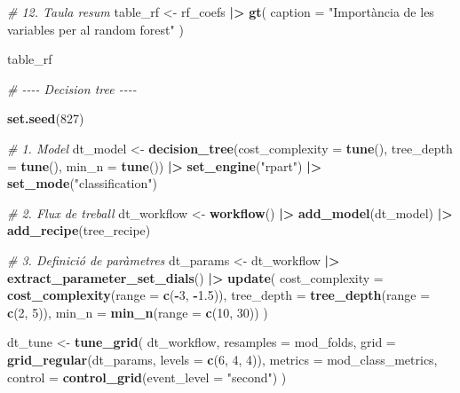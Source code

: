 \documentclass[CAT]{TFUOC}%
\newenvironment{Shaded}{\begin{snugshade}}{\end{snugshade}}
\newcommand{\AttributeTok}[1]{\textcolor[rgb]{0.13,0.29,0.53}{#1}}
\newcommand{\CommentTok}[1]{\textcolor[rgb]{0.56,0.35,0.01}{\textit{#1}}}
\newcommand{\DecValTok}[1]{\textcolor[rgb]{0.00,0.00,0.81}{#1}}
\newcommand{\FloatTok}[1]{\textcolor[rgb]{0.00,0.00,0.81}{#1}}
\newcommand{\FunctionTok}[1]{\textcolor[rgb]{0.13,0.29,0.53}{\textbf{#1}}}
\newcommand{\NormalTok}[1]{#1}
\newcommand{\OtherTok}[1]{\textcolor[rgb]{0.56,0.35,0.01}{#1}}
\newcommand{\SpecialCharTok}[1]{\textcolor[rgb]{0.81,0.36,0.00}{\textbf{#1}}}
\newcommand{\StringTok}[1]{\textcolor[rgb]{0.31,0.60,0.02}{#1}}
\begin{document}
\begin{Shaded}
\begin{Highlighting}[]
\CommentTok{\# 12. Taula resum}
\NormalTok{table\_rf }\OtherTok{\textless{}{-}}\NormalTok{ rf\_coefs }\SpecialCharTok{|\textgreater{}} 
  \FunctionTok{gt}\NormalTok{(}
    \AttributeTok{caption =} \StringTok{"Importància de les variables per al random forest"}
\NormalTok{  )}

\NormalTok{table\_rf}

\CommentTok{\# {-}{-}{-}{-} Decision tree {-}{-}{-}{-}}

\FunctionTok{set.seed}\NormalTok{(}\DecValTok{827}\NormalTok{)}

\CommentTok{\# 1. Model}
\NormalTok{dt\_model }\OtherTok{\textless{}{-}} \FunctionTok{decision\_tree}\NormalTok{(}\AttributeTok{cost\_complexity =} \FunctionTok{tune}\NormalTok{(), }
                          \AttributeTok{tree\_depth =} \FunctionTok{tune}\NormalTok{(), }
                          \AttributeTok{min\_n =} \FunctionTok{tune}\NormalTok{()) }\SpecialCharTok{|\textgreater{}} 
  \FunctionTok{set\_engine}\NormalTok{(}\StringTok{"rpart"}\NormalTok{) }\SpecialCharTok{|\textgreater{}} 
  \FunctionTok{set\_mode}\NormalTok{(}\StringTok{"classification"}\NormalTok{)}

\CommentTok{\# 2. Flux de treball}
\NormalTok{dt\_workflow }\OtherTok{\textless{}{-}} \FunctionTok{workflow}\NormalTok{() }\SpecialCharTok{|\textgreater{}} 
  \FunctionTok{add\_model}\NormalTok{(dt\_model) }\SpecialCharTok{|\textgreater{}} 
  \FunctionTok{add\_recipe}\NormalTok{(tree\_recipe)}

\CommentTok{\# 3. Definició de paràmetres}
\NormalTok{dt\_params }\OtherTok{\textless{}{-}}\NormalTok{ dt\_workflow }\SpecialCharTok{|\textgreater{}} 
  \FunctionTok{extract\_parameter\_set\_dials}\NormalTok{() }\SpecialCharTok{|\textgreater{}} 
  \FunctionTok{update}\NormalTok{(}
    \AttributeTok{cost\_complexity =} \FunctionTok{cost\_complexity}\NormalTok{(}\AttributeTok{range =} \FunctionTok{c}\NormalTok{(}\SpecialCharTok{{-}}\DecValTok{3}\NormalTok{, }\SpecialCharTok{{-}}\FloatTok{1.5}\NormalTok{)), }
    \AttributeTok{tree\_depth =} \FunctionTok{tree\_depth}\NormalTok{(}\AttributeTok{range =} \FunctionTok{c}\NormalTok{(}\DecValTok{2}\NormalTok{, }\DecValTok{5}\NormalTok{)), }
    \AttributeTok{min\_n =} \FunctionTok{min\_n}\NormalTok{(}\AttributeTok{range =} \FunctionTok{c}\NormalTok{(}\DecValTok{10}\NormalTok{, }\DecValTok{30}\NormalTok{))}
\NormalTok{  )}

\NormalTok{dt\_tune }\OtherTok{\textless{}{-}} \FunctionTok{tune\_grid}\NormalTok{(}
\NormalTok{  dt\_workflow, }
  \AttributeTok{resamples =}\NormalTok{ mod\_folds, }
  \AttributeTok{grid =} \FunctionTok{grid\_regular}\NormalTok{(dt\_params, }\AttributeTok{levels =} \FunctionTok{c}\NormalTok{(}\DecValTok{6}\NormalTok{, }\DecValTok{4}\NormalTok{, }\DecValTok{4}\NormalTok{)), }
  \AttributeTok{metrics =}\NormalTok{ mod\_class\_metrics, }
  \AttributeTok{control =} \FunctionTok{control\_grid}\NormalTok{(}\AttributeTok{event\_level =} \StringTok{"second"}\NormalTok{)}
\NormalTok{)}


\end{Highlighting}
\end{Shaded}
\end{document}
